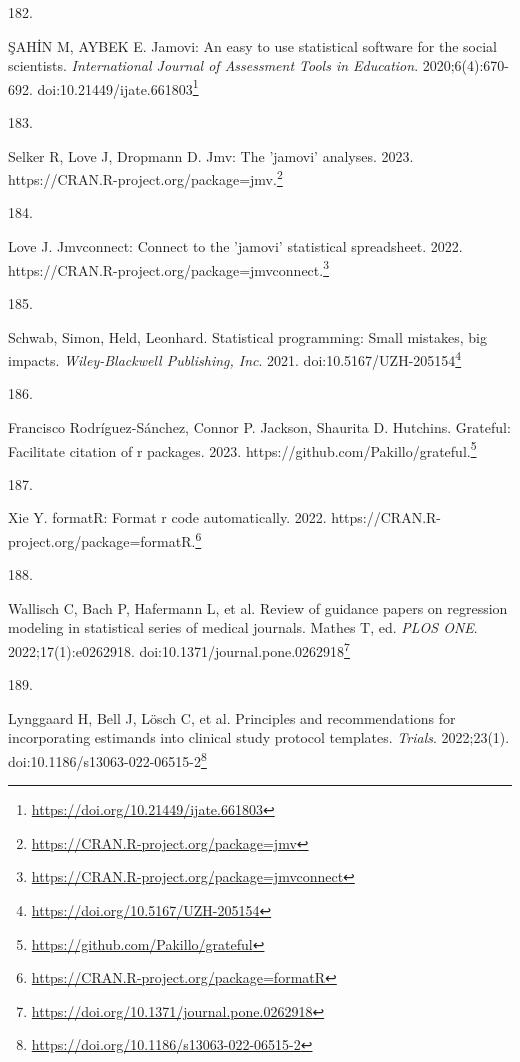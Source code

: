 \documentclass[
  a4paper,
]{book}
\newlength{\cslhangindent}
\newlength{\csllabelwidth}
\newlength{\cslentryspacingunit} %
\newenvironment{CSLReferences}[2] %
 {%
  \setlength{\parindent}{0pt}
  \ifodd #1
  \let\oldpar\par
  \def\par{\hangindent=\cslhangindent\oldpar}
  \fi
  \setlength{\parskip}{#2\cslentryspacingunit}
 }%
 {}
\newcommand{\CSLLeftMargin}[1]{\parbox[t]{\csllabelwidth}{#1}}
\newcommand{\CSLRightInline}[1]{\parbox[t]{\linewidth - \csllabelwidth}{#1}\break}
\renewcommand{\href}[2]{#2\footnote{\url{#1}}}
\begin{document}
\begin{CSLReferences}{0}{0}
\leavevmode{}%
\CSLLeftMargin{182. }%
\CSLRightInline{ŞAHİN M, AYBEK E. Jamovi: An easy to use statistical software for the social scientists. \emph{International Journal of Assessment Tools in Education}. 2020;6(4):670-692. doi:\href{https://doi.org/10.21449/ijate.661803}{10.21449/ijate.661803}}

\leavevmode{}%
\CSLLeftMargin{183. }%
\CSLRightInline{Selker R, Love J, Dropmann D. Jmv: The 'jamovi' analyses. 2023. \href{https://CRAN.R-project.org/package=jmv}{https://CRAN.R-project.org/package=jmv.}}

\leavevmode{}%
\CSLLeftMargin{184. }%
\CSLRightInline{Love J. Jmvconnect: Connect to the 'jamovi' statistical spreadsheet. 2022. \href{https://CRAN.R-project.org/package=jmvconnect}{https://CRAN.R-project.org/package=jmvconnect.}}

\leavevmode{}%
\CSLLeftMargin{185. }%
\CSLRightInline{Schwab, Simon, Held, Leonhard. Statistical programming: Small mistakes, big impacts. \emph{Wiley-Blackwell Publishing, Inc}. 2021. doi:\href{https://doi.org/10.5167/UZH-205154}{10.5167/UZH-205154}}

\leavevmode{}%
\CSLLeftMargin{186. }%
\CSLRightInline{Francisco Rodríguez-Sánchez, Connor P. Jackson, Shaurita D. Hutchins. Grateful: Facilitate citation of r packages. 2023. \href{https://github.com/Pakillo/grateful}{https://github.com/Pakillo/grateful.}}

\leavevmode{}%
\CSLLeftMargin{187. }%
\CSLRightInline{Xie Y. formatR: Format r code automatically. 2022. \href{https://CRAN.R-project.org/package=formatR}{https://CRAN.R-project.org/package=formatR.}}

\leavevmode{}%
\CSLLeftMargin{188. }%
\CSLRightInline{Wallisch C, Bach P, Hafermann L, et al. Review of guidance papers on regression modeling in statistical series of medical journals. Mathes T, ed. \emph{PLOS ONE}. 2022;17(1):e0262918. doi:\href{https://doi.org/10.1371/journal.pone.0262918}{10.1371/journal.pone.0262918}}

\leavevmode{}%
\CSLLeftMargin{189. }%
\CSLRightInline{Lynggaard H, Bell J, Lösch C, et al. Principles and recommendations for incorporating estimands into clinical study protocol templates. \emph{Trials}. 2022;23(1). doi:\href{https://doi.org/10.1186/s13063-022-06515-2}{10.1186/s13063-022-06515-2}}


\end{CSLReferences}
\end{document}
